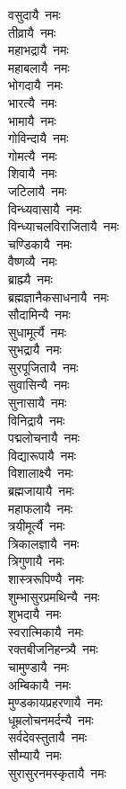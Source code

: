 \begin{multicols}{2}
\begin{flushleft}
वसुदायै~नमः\\
तीव्रायै~नमः\\
महाभद्रायै~नमः\\
महाबलायै~नमः\\
भोगदायै~नमः\\
भारत्यै~नमः\\
भामायै~नमः\\
गोविन्दायै~नमः\\
गोमत्यै~नमः\hfill{}\\
शिवायै~नमः\\
जटिलायै~नमः\\
विन्ध्यवासायै~नमः\\
विन्ध्याचलविराजितायै~नमः\\
चण्डिकायै~नमः\\
वैष्णव्यै~नमः\\
ब्राह्म्यै~नमः\\
ब्रह्मज्ञानैकसाधनायै~नमः\\
सौदामिन्यै~नमः\\
सुधामूर्त्यै~नमः\hfill{}\\
सुभद्रायै~नमः\\
सुरपूजितायै~नमः\\
सुवासिन्यै~नमः\\
सुनासायै~नमः\\
विनिद्रायै~नमः\\
पद्मलोचनायै~नमः\\
विद्यारूपायै~नमः\\
विशालाक्ष्यै~नमः\\
ब्रह्मजायायै~नमः\\
महाफलायै~नमः\hfill{}\\
त्रयीमूर्त्यै~नमः\\
त्रिकालज्ञायै~नमः\\
त्रिगुणायै~नमः\\
शास्त्ररूपिण्यै~नमः\\
शुम्भासुरप्रमथिन्यै~नमः\\
शुभदायै~नमः\\
स्वरात्मिकायै~नमः\\
रक्तबीजनिहन्त्र्यै~नमः\\
चामुण्डायै~नमः\\
अम्बिकायै~नमः\hfill{}\\
मुण्डकायप्रहरणायै~नमः\\
धूम्रलोचनमर्दन्यै~नमः\\
सर्वदेवस्तुतायै~नमः\\
सौम्यायै~नमः\\
सुरासुरनमस्कृतायै~नमः\\

\end{flushleft}
\end{multicols}
